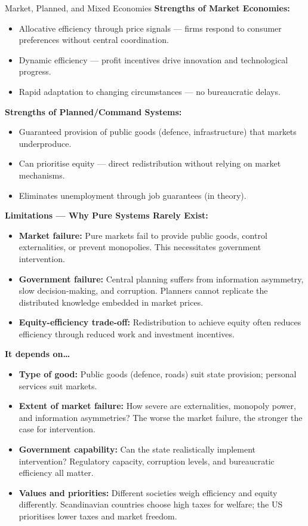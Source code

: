 \documentclass[11pt, a4paper, twoside]{book}
\begin{document}
\begin{evaluation}{Market, Planned, and Mixed Economies}
\textbf{Strengths of Market Economies:}
\begin{itemize}[leftmargin=*, nosep]
\item Allocative efficiency through price signals — firms respond to consumer preferences without central coordination.
\item Dynamic efficiency — profit incentives drive innovation and technological progress.
\item Rapid adaptation to changing circumstances — no bureaucratic delays.
\end{itemize}

\textbf{Strengths of Planned/Command Systems:}
\begin{itemize}[leftmargin=*, nosep]
\item Guaranteed provision of public goods (defence, infrastructure) that markets underproduce.
\item Can prioritise equity — direct redistribution without relying on market mechanisms.
\item Eliminates unemployment through job guarantees (in theory).
\end{itemize}

\textbf{Limitations — Why Pure Systems Rarely Exist:}
\begin{itemize}[leftmargin=*, nosep]
\item \textbf{Market failure:} Pure markets fail to provide public goods, control externalities, or prevent monopolies. This necessitates government intervention.
\item \textbf{Government failure:} Central planning suffers from information asymmetry, slow decision-making, and corruption. Planners cannot replicate the distributed knowledge embedded in market prices.
\item \textbf{Equity-efficiency trade-off:} Redistribution to achieve equity often reduces efficiency through reduced work and investment incentives.
\end{itemize}

\textbf{It depends on\ldots}
\begin{itemize}[leftmargin=*, nosep]
\item \textbf{Type of good:} Public goods (defence, roads) suit state provision; personal services suit markets.
\item \textbf{Extent of market failure:} How severe are externalities, monopoly power, and information asymmetries? The worse the market failure, the stronger the case for intervention.
\item \textbf{Government capability:} Can the state realistically implement intervention? Regulatory capacity, corruption levels, and bureaucratic efficiency all matter.
\item \textbf{Values and priorities:} Different societies weigh efficiency and equity differently. Scandinavian countries choose high taxes for welfare; the US prioritises lower taxes and market freedom.
\end{itemize}
\end{evaluation}
\end{document}
